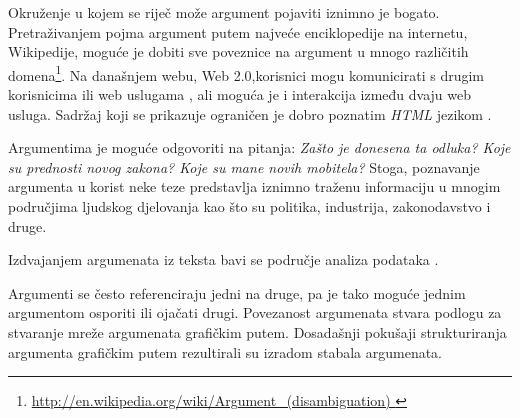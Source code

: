 Okruženje u kojem se riječ može argument pojaviti iznimno je bogato.
Pretraživanjem pojma argument putem najveće enciklopedije na internetu,
Wikipedije, moguće je dobiti sve poveznice na argument u mnogo različitih
domena\footnote{ \url{http://en.wikipedia.org/wiki/Argument_(disambiguation) } }.
Na današnjem webu, Web 2.0,korisnici mogu komunicirati s drugim korisnicima ili
web uslugama , ali moguća je i interakcija između dvaju web
usluga. Sadržaj koji se prikazuje ograničen je dobro poznatim \emph{HTML}
jezikom . 

Argumentima je moguće odgovoriti na pitanja: \emph{Zašto je donesena ta odluka?
Koje su prednosti novog zakona? Koje su mane novih mobitela?} Stoga, poznavanje
argumenta u korist neke teze predstavlja iznimno traženu informaciju u mnogim
područjima ljudskog djelovanja kao što su politika, industrija, zakonodavstvo i
druge. 

Izdvajanjem argumenata iz teksta bavi se područje analiza podataka
.   

Argumenti se često referenciraju jedni na druge, pa je tako moguće jednim
argumentom osporiti ili ojačati drugi. Povezanost argumenata stvara podlogu za
stvaranje mreže argumenata grafičkim putem. Dosadašnji pokušaji strukturiranja
argumenta grafičkim putem rezultirali su izradom stabala argumenata.  
